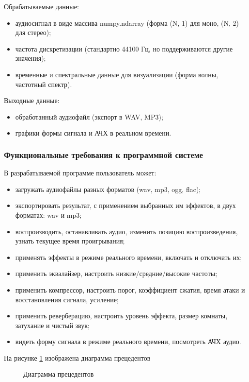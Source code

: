 Обрабатываемые данные:
\begin{itemize}
	\item аудиосигнал в виде массива numpy.ndarray (форма (N, 1) для моно, (N, 2) для стерео); 
	\item частота дискретизации (стандартно 44100 Гц, но поддерживаются другие значения);
	\item временные и спектральные данные для визуализации (форма волны, частотный спектр).
\end{itemize}

Выходные данные:
\begin{itemize}
	\item обработанный аудиофайл (экспорт в WAV, MP3);
	\item графики формы сигнала и АЧХ в реальном времени.
\end{itemize}

\subsubsection{Функциональные требования к программной системе}

В разрабатываемой программе пользователь может:
\begin{itemize}
	\item загружать аудиофайлы разных форматов (wav, mp3, ogg, flac);
	\item экспортировать результат, с применением выбранных им эффектов, в двух форматах: wav и mp3;
	\item воспроизводить, останавливать аудио, изменить позицию воспроизведения, узнать текущее время проигрывания;
	\item применять эффекты в режиме реального времени, включать и отключать их;
	\item применить эквалайзер, настроить низкие/средние/высокие частоты;
	\item применить компрессор, настроить порог, коэффициент сжатия, время атаки и восстановления сигнала, усиление;
	\item применить реверберацию, настроить уровень эффекта, размер комнаты, затухание и чистый звук;
	\item видеть форму сигнала в режиме реального времени, посмотреть АЧХ аудио.
\end{itemize}

На рисунке \ref{fig:use_case_diagram} изображена диаграмма прецедентов

\begin{figure}[ht]
	\caption{Диаграмма прецедентов}
	\label{fig:use_case_diagram}
\end{figure}

